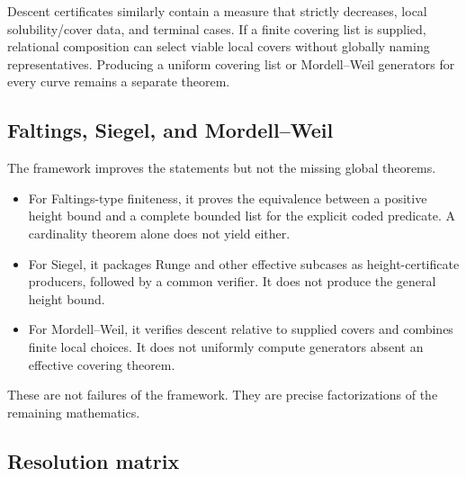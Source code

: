 Descent certificates similarly contain a measure that strictly decreases, local solubility/cover data, and terminal cases.  If a finite covering list is supplied, relational composition can select viable local covers without globally naming representatives.  Producing a uniform covering list or Mordell--Weil generators for every curve remains a separate theorem.

\subsection{Faltings, Siegel, and Mordell--Weil}

The framework improves the statements but not the missing global theorems.

\begin{itemize}
\item For Faltings-type finiteness, it proves the equivalence between a positive height bound and a complete bounded list for the explicit coded predicate.  A cardinality theorem alone does not yield either.
\item For Siegel, it packages Runge and other effective subcases as height-certificate producers, followed by a common verifier.  It does not produce the general height bound.
\item For Mordell--Weil, it verifies descent relative to supplied covers and combines finite local choices.  It does not uniformly compute generators absent an effective covering theorem.
\end{itemize}

These are not failures of the framework.  They are precise factorizations of the remaining mathematics.

\subsection{Resolution matrix}

